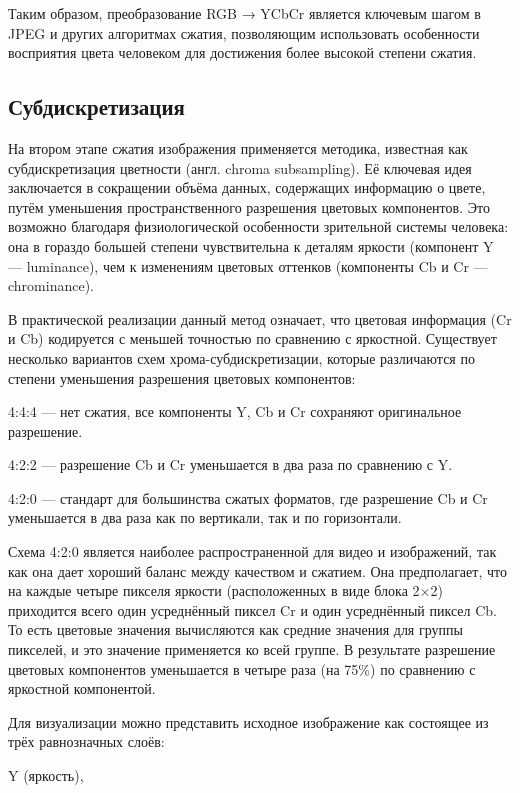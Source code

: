    Таким образом, преобразование RGB → YCbCr является ключевым шагом в JPEG и других алгоритмах сжатия, 
    позволяющим использовать особенности восприятия цвета человеком для достижения более высокой степени сжатия.



\subsection{Субдискретизация}
На втором этапе сжатия изображения применяется методика, известная как субдискретизация цветности (англ. chroma subsampling). 
Её ключевая идея заключается в сокращении объёма данных, содержащих информацию о цвете, путём уменьшения пространственного разрешения цветовых компонентов. 
Это возможно благодаря физиологической особенности зрительной системы человека: 
она в гораздо большей степени чувствительна к деталям яркости (компонент Y — luminance), чем к изменениям цветовых оттенков (компоненты Cb и Cr — chrominance).

В практической реализации данный метод означает, что цветовая информация (Cr и Cb) кодируется с меньшей точностью по сравнению с яркостной. 
Существует несколько вариантов схем хрома-субдискретизации, которые различаются по степени уменьшения разрешения цветовых компонентов:

4:4:4 — нет сжатия, все компоненты Y, Cb и Cr сохраняют оригинальное разрешение.

4:2:2 — разрешение Cb и Cr уменьшается в два раза по сравнению с Y.

4:2:0 — стандарт для большинства сжатых форматов, где разрешение Cb и Cr уменьшается в два раза как по вертикали, так и по горизонтали.

Схема 4:2:0 является наиболее распространенной для видео и изображений, так как она дает хороший баланс между качеством и сжатием. 
Она предполагает, что на каждые четыре пикселя яркости (расположенных в виде блока 2×2) приходится всего один усреднённый пиксел Cr и один усреднённый пиксел Cb. 
То есть цветовые значения вычисляются как средние значения для группы пикселей, и это значение применяется ко всей группе. 
В результате разрешение цветовых компонентов уменьшается в четыре раза (на 75\%) по сравнению с яркостной компонентой.

Для визуализации можно представить исходное изображение как состоящее из трёх равнозначных слоёв:

Y (яркость),

